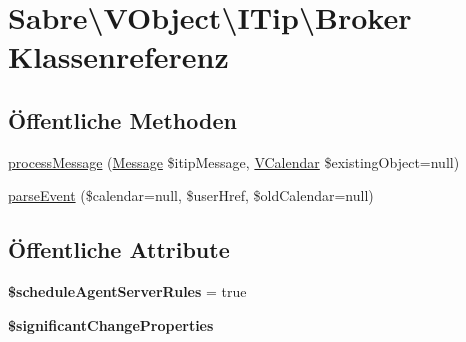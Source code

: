 \hypertarget{class_sabre_1_1_v_object_1_1_i_tip_1_1_broker}{}\section{Sabre\textbackslash{}V\+Object\textbackslash{}I\+Tip\textbackslash{}Broker Klassenreferenz}
\label{class_sabre_1_1_v_object_1_1_i_tip_1_1_broker}
\subsection*{Öffentliche Methoden}
\begin{DoxyCompactItemize}
\item 
\mbox{\hyperlink{class_sabre_1_1_v_object_1_1_i_tip_1_1_broker_a434d78cfdc58d31dd1342b1d2ed19a7e}{process\+Message}} (\mbox{\hyperlink{class_sabre_1_1_v_object_1_1_i_tip_1_1_message}{Message}} \$itip\+Message, \mbox{\hyperlink{class_sabre_1_1_v_object_1_1_component_1_1_v_calendar}{V\+Calendar}} \$existing\+Object=null)
\item 
\mbox{\hyperlink{class_sabre_1_1_v_object_1_1_i_tip_1_1_broker_acb5d4eee69b3e712877343b031bddddf}{parse\+Event}} (\$calendar=null, \$user\+Href, \$old\+Calendar=null)
\end{DoxyCompactItemize}
\subsection*{Öffentliche Attribute}
\begin{DoxyCompactItemize}
\item 
\mbox{\label{class_sabre_1_1_v_object_1_1_i_tip_1_1_broker_a3c313eeda38bb5e2e86950eb9978e563}} 
{\bfseries \$schedule\+Agent\+Server\+Rules} = true
\item 
{\bfseries \$significant\+Change\+Properties}
\end{DoxyCompactItemize}
